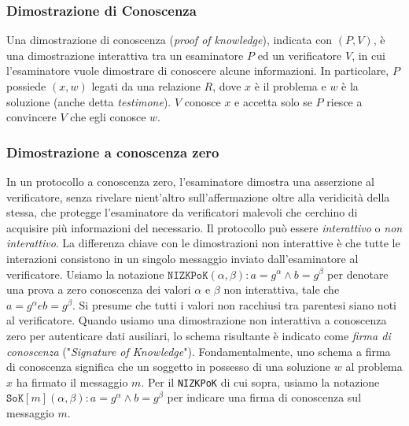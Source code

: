 \subsubsection{Dimostrazione di Conoscenza}
Una dimostrazione di conoscenza (\emph{proof of knowledge}), indicata con $(P, V)$, è una dimostrazione interattiva tra un esaminatore $P$ ed un verificatore $V$, in cui l'esaminatore vuole dimostrare di conoscere alcune informazioni. In particolare, $P$ possiede $(x, w)$ legati da una relazione $R$, dove $x$ è il problema e $w$ è la soluzione (anche detta \emph{testimone}). $V$ conosce $x$ e accetta solo se $P$ riesce a convincere $V$ che egli conosce $w$.

\subsubsection{Dimostrazione a conoscenza zero}
In un protocollo a conoscenza zero, l'esaminatore dimostra una asserzione al verificatore, senza rivelare nient'altro sull'affermazione oltre alla veridicità della stessa, che protegge l'esaminatore da verificatori malevoli che cerchino di acquisire più informazioni del necessario. Il protocollo può essere \emph{interattivo} o \emph{non interattivo}. La differenza chiave con le dimostrazioni non interattive è che tutte le interazioni consistono in un singolo messaggio inviato dall'esaminatore al verificatore. Usiamo la notazione $\texttt{NIZKPoK}(\alpha, \beta): a = g^{\alpha} \wedge b = g^{\beta}$ per denotare una prova a zero conoscenza dei valori $\alpha$ e $\beta$ non interattiva, tale che $a = g^{\alpha} e b = g^{\beta}$. Si presume che tutti i valori non racchiusi tra parentesi siano noti al verificatore. Quando usiamo una dimostrazione non interattiva a conoscenza zero per autenticare dati ausiliari, lo schema risultante è indicato come \emph{firma di conoscenza} ("\emph{Signature of Knowledge}")\cite{c8}. Fondamentalmente, uno schema a firma di conoscenza significa che un soggetto in possesso di una soluzione $w$ al problema $x$ ha firmato il messaggio $m$. Per il \texttt{NIZKPoK} di cui sopra, usiamo la notazione $\texttt{SoK}[m](\alpha, \beta): a = g^{\alpha} \wedge b = g^{\beta}$ per indicare una firma di conoscenza sul messaggio $m$.

